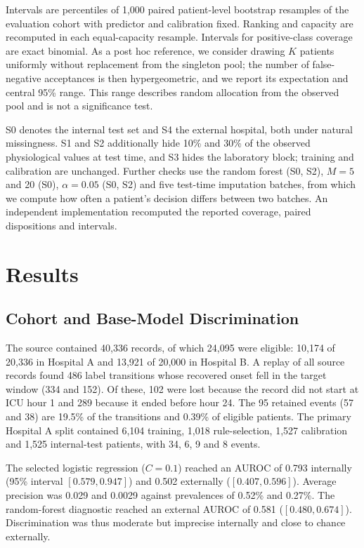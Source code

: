 \documentclass[conference]{IEEEtran}
\begin{document}
Intervals are percentiles of 1,000 paired patient-level bootstrap resamples of the evaluation cohort with predictor and calibration fixed. Ranking and capacity are recomputed in each equal-capacity resample. Intervals for positive-class coverage are exact binomial. As a post hoc reference, we consider drawing $K$ patients uniformly without replacement from the singleton pool; the number of false-negative acceptances is then hypergeometric, and we report its expectation and central 95\% range. This range describes random allocation from the observed pool and is not a significance test.

S0 denotes the internal test set and S4 the external hospital, both under natural missingness. S1 and S2 additionally hide 10\% and 30\% of the observed physiological values at test time, and S3 hides the laboratory block; training and calibration are unchanged. Further checks use the random forest (S0, S2), $M=5$ and 20 (S0), $\alpha=0.05$ (S0, S2) and five test-time imputation batches, from which we compute how often a patient's decision differs between two batches. An independent implementation recomputed the reported coverage, paired dispositions and intervals.

\section{Results}

\subsection{Cohort and Base-Model Discrimination}
The source contained 40,336 records, of which 24,095 were eligible: 10,174 of 20,336 in Hospital A and 13,921 of 20,000 in Hospital B. A replay of all source records found 486 label transitions whose recovered onset fell in the target window (334 and 152). Of these, 102 were lost because the record did not start at ICU hour 1 and 289 because it ended before hour 24. The 95 retained events (57 and 38) are 19.5\% of the transitions and 0.39\% of eligible patients. The primary Hospital A split contained 6,104 training, 1,018 rule-selection, 1,527 calibration and 1,525 internal-test patients, with 34, 6, 9 and 8 events.

The selected logistic regression ($C=0.1$) reached an AUROC of 0.793 internally (95\% interval $[0.579, 0.947]$) and 0.502 externally ($[0.407, 0.596]$). Average precision was 0.029 and 0.0029 against prevalences of 0.52\% and 0.27\%. The random-forest diagnostic reached an external AUROC of 0.581 ($[0.480, 0.674]$). Discrimination was thus moderate but imprecise internally and close to chance externally.
\end{document}
